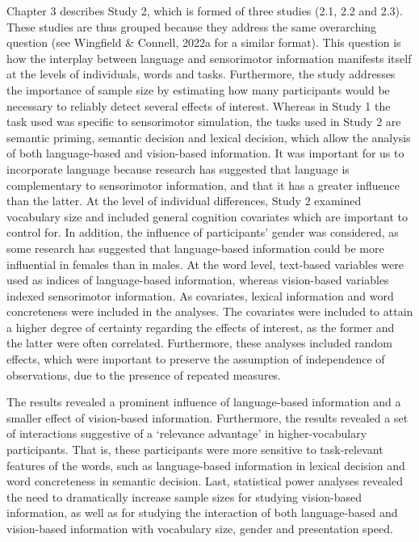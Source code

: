 \documentclass[
  12pt,
  man,floatsintext]{apa7}
\begin{document}
Chapter 3 describes Study 2, which is formed of three studies (2.1, 2.2 and 2.3). These studies are thus grouped because they address the same overarching question (see Wingfield \& Connell, 2022a for a similar format). This question is how the interplay between language and sensorimotor information manifests itself at the levels of individuals, words and tasks. Furthermore, the study addresses the importance of sample size by estimating how many participants would be necessary to reliably detect several effects of interest. Whereas in Study 1 the task used was specific to sensorimotor simulation, the tasks used in Study 2 are semantic priming, semantic decision and lexical decision, which allow the analysis of both language-based and vision-based information. It was important for us to incorporate language because research has suggested that language is complementary to sensorimotor information, and that it has a greater influence than the latter. At the level of individual differences, Study 2 examined vocabulary size and included general cognition covariates which are important to control for. In addition, the influence of participants' gender was considered, as some research has suggested that language-based information could be more influential in females than in males. At the word level, text-based variables were used as indices of language-based information, whereas vision-based variables indexed sensorimotor information. As covariates, lexical information and word concreteness were included in the analyses. The covariates were included to attain a higher degree of certainty regarding the effects of interest, as the former and the latter were often correlated. Furthermore, these analyses included random effects, which were important to preserve the assumption of independence of observations, due to the presence of repeated measures.

The results revealed a prominent influence of language-based information and a smaller effect of vision-based information. Furthermore, the results revealed a set of interactions suggestive of a `relevance advantage' in higher-vocabulary participants. That is, these participants were more sensitive to task-relevant features of the words, such as language-based information in lexical decision and word concreteness in semantic decision. Last, statistical power analyses revealed the need to dramatically increase sample sizes for studying vision-based information, as well as for studying the interaction of both language-based and vision-based information with vocabulary size, gender and presentation speed.
\end{document}
